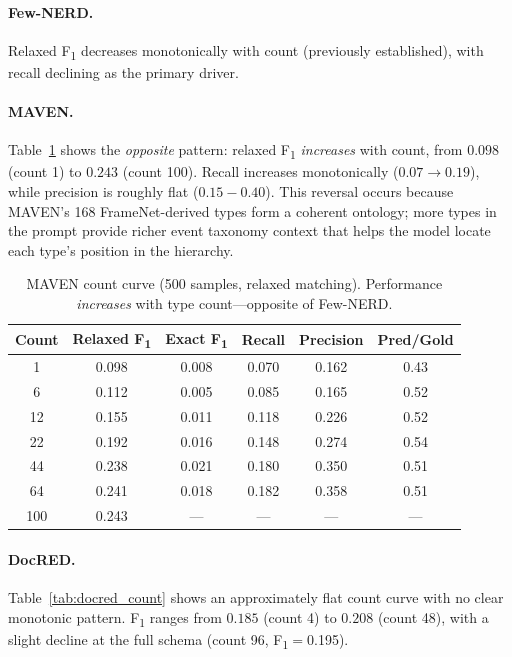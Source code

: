 \documentclass[11pt,a4paper]{article}
\newcommand{\fone}{F\textsubscript{1}}
\begin{document}
\paragraph{Few-NERD.}
Relaxed \fone{} decreases monotonically with count (previously established), with recall declining as the primary driver.

\paragraph{MAVEN.}
Table~\ref{tab:maven_count} shows the \emph{opposite} pattern: relaxed \fone{} \emph{increases} with count, from $0.098$ (count 1) to $0.243$ (count 100).
Recall increases monotonically ($0.07{\to}0.19$), while precision is roughly flat ($0.15{-}0.40$).
This reversal occurs because MAVEN's 168 FrameNet-derived types form a coherent ontology; more types in the prompt provide richer event taxonomy context that helps the model locate each type's position in the hierarchy.

\begin{table}[t]
\centering
\caption{MAVEN count curve (500 samples, relaxed matching). Performance \emph{increases} with type count---opposite of Few-NERD.}
\label{tab:maven_count}
\small
\begin{tabular}{cccccc}
\toprule
\textbf{Count} & \textbf{Relaxed \fone{}} & \textbf{Exact \fone{}} & \textbf{Recall} & \textbf{Precision} & \textbf{Pred/Gold} \\
\midrule
1  & 0.098 & 0.008 & 0.070 & 0.162 & 0.43 \\
6  & 0.112 & 0.005 & 0.085 & 0.165 & 0.52 \\
12 & 0.155 & 0.011 & 0.118 & 0.226 & 0.52 \\
22 & 0.192 & 0.016 & 0.148 & 0.274 & 0.54 \\
44 & 0.238 & 0.021 & 0.180 & 0.350 & 0.51 \\
64 & 0.241 & 0.018 & 0.182 & 0.358 & 0.51 \\
100 & 0.243 & --- & --- & --- & --- \\
\bottomrule
\end{tabular}
\end{table}

\paragraph{DocRED.}
Table~\ref{tab:docred_count} shows an approximately flat count curve with no clear monotonic pattern.
\fone{} ranges from $0.185$ (count 4) to $0.208$ (count 48), with a slight decline at the full schema (count 96, \fone{}$=$0.195).
\end{document}
